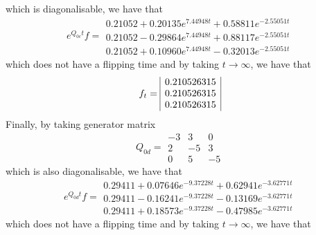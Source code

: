 \documentclass{article}
\begin{document}
which is diagonalisable, we have that
\begin{equation*} 
 e^{Q_{0c}t}f = 
 \begin{array}{|r|}
  0.21052+0.20135e^{7.44948t}+0.58811e^{-2.55051t}\\
  0.21052-0.29864e^{7.44948t}+0.88117e^{-2.55051t}\\
  0.21052+0.10960e^{7.44948t}-0.32013e^{-2.55051t}
 \end{array}
 \end{equation*}
which does not have a flipping time and by taking $t\to\infty$, we have that
\begin{equation*} 
 f_{t}= 
 \begin{array}{|r|}
  0.210526315\\
  0.210526315\\  
  0.210526315
 \end{array}\\\\
 \end{equation*}
 Finally, by taking generator matrix 
\begin{equation*} 
 Q_{0d}= 
 \begin{array}{|rrr|}
  -3 & 3 & 0 \\
  2 & -5 & 3 \\
  0 & 5 & -5  
 \end{array}
 \end{equation*}
which is also diagonalisable, we have that
\begin{equation*} 
 e^{Q_{0d}t}f = 
 \begin{array}{|r|}   
  0.29411+0.07646e^{-9.37228t}+0.62941e^{-3.62771t}\\
  0.29411-0.16241e^{-9.37228t}-0.13169e^{-3.62771t}\\
  0.29411+0.18573e^{-9.37228t}-0.47985e^{-3.62771t}
 \end{array}
 \end{equation*}
which does not have a flipping time and by taking $t\to\infty$, we have that
\end{document}
